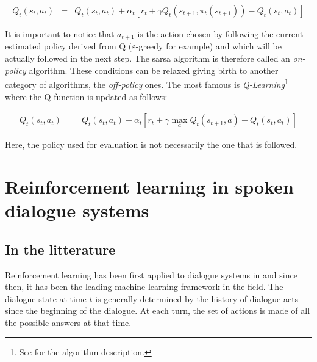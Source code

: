 			\begin{eqnarray}
				Q_t(s_t,a_t) & = & Q_t(s_t,a_t) + \alpha_t [r_t + \gamma Q_t(s_{t+1},\pi_t(s_{t+1})) - Q_t(s_t,a_t)] \label{eq:sarsaupdate}
			\end{eqnarray}
			
			It is important to notice that $a_{t+1}$ is the action chosen by following the current estimated policy derived from Q ($\varepsilon$-greedy for example) and which will be actually followed in the next step. The sarsa algorithm is therefore called an \textit{on-policy} algorithm. These conditions can be relaxed giving birth to another category of algorithms, the \textit{off-policy} ones. The most famous is \textit{Q-Learning}\footnote{See \cite{Sutton1998} for the algorithm description.} \cite{Watkins1989} where the Q-function is updated as follows:
			
			\begin{eqnarray}
				Q_t(s_t,a_t) & = & Q_t(s_t,a_t) + \alpha_t [r_t + \gamma \max_a Q_t(s_{t+1},a) - Q_t(s_t,a_t)] \label{eq:qlearningupdate}
			\end{eqnarray}
			
			Here, the policy used for evaluation is not necessarily the one that is followed.

\section{Reinforcement learning in spoken dialogue systems}
	
	\subsection{In the litterature}
	
		Reinforcement learning has been first applied to dialogue systems in \cite{Levin1997b} and since then, it has been the leading machine learning framework in the field. The dialogue state at time $t$ is generally determined by the history of dialogue acts since the beginning of the dialogue. At each turn, the set of actions is made of all the possible answers at that time.
		
